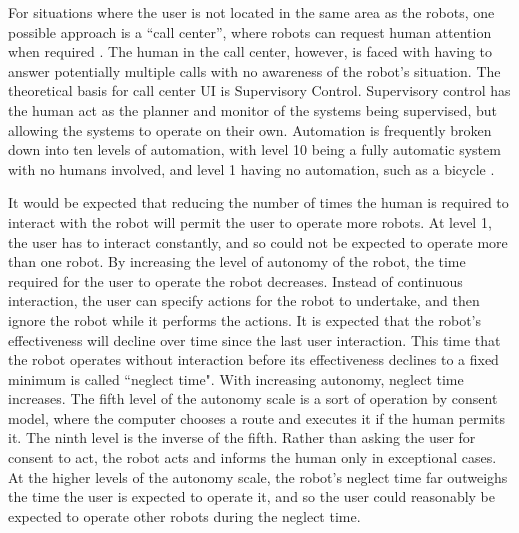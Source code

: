 \documentclass[]{article}
\begin{document}
For situations where the user is not located in the same area as the robots, one possible approach is a ``call center'', where robots can request human attention when required \cite{chen2011supervisory}. 
The human in the call center, however, is faced with having to answer potentially multiple calls with no awareness of the robot's situation. 
The theoretical basis for call center UI is Supervisory Control. 
Supervisory control has the human act as the planner and monitor of the systems being supervised, but allowing the systems to operate on their own.
Automation is frequently broken down into ten levels of automation, with level 10 being a fully automatic system with no humans involved, and level 1 having no automation, such as a bicycle \cite{parasuraman2000model}. 

It would be expected that reducing the number of times the human is required to interact with the robot will permit the user to operate more robots.
At level 1, the user has to interact constantly, and so could not be expected to operate more than one robot. 
By increasing the level of autonomy of the robot, the time required for the user to operate the robot decreases.
Instead of continuous interaction, the user can specify actions for the robot to undertake, and then ignore the robot while it performs the actions.
It is expected that the robot's effectiveness will decline over time since the last user interaction. 
This time that the robot operates without interaction before its effectiveness declines to a fixed minimum is called ``neglect time"\cite{olsen2003metrics}.
With increasing autonomy, neglect time increases.
The fifth level of the autonomy scale is a sort of operation by consent model, where the computer chooses a route and executes it if the human permits it. 
The ninth level is the inverse of the fifth.
Rather than asking the user for consent to act, the robot acts and informs the human only in exceptional cases. 
At the higher levels of the autonomy scale, the robot's neglect time far outweighs the time the user is expected to operate it, and so the user could reasonably be expected to operate other robots during the neglect time. 
\end{document}
